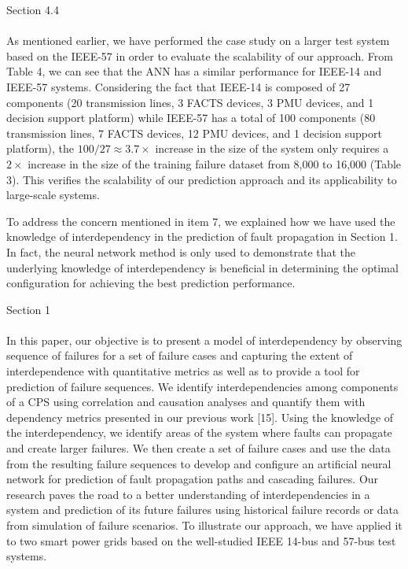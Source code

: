 \documentclass{article}
\newenvironment{response}{
  \doublespacing
  \setlength\parindent{0.05\linewidth}
  \ttfamily
}{}
\newenvironment{textblock}[1]
{\begin{tcolorbox}[breakable,enhanced]{#1 \\ \\}}
{\end{tcolorbox}}
\begin{document}
\begin{response}
\begin{textblock}{Section 4.4}
As mentioned earlier, we have performed the case study on a larger test system based on the IEEE-57 in order to evaluate the scalability of our approach. From Table 4, we can see that the ANN has a similar performance for IEEE-14 and IEEE-57 systems. Considering the fact that IEEE-14 is composed of 27 components (20 transmission lines, 3 FACTS devices, 3 PMU devices, and 1 decision support platform) while IEEE-57 has a total of 100 components (80 transmission lines, 7 FACTS devices, 12 PMU devices, and 1 decision support platform), the $100/27 \approx 3.7 \times$ increase in the size of the system only requires a $2 \times$ increase in the size of the training failure dataset from 8,000 to 16,000 (Table 3). This verifies the scalability of our prediction approach and its applicability to large-scale systems.
\end{textblock}

To address the concern mentioned in item 7, we explained how we have used the knowledge of interdependency in the prediction of fault propagation in Section 1. In fact, the neural network method is only used to demonstrate that the underlying knowledge of interdependency is beneficial in determining the optimal configuration for achieving the best prediction performance.

\begin{textblock}{Section 1}
In this paper, our objective is to present a model of interdependency by observing sequence of failures for a set of failure cases and capturing the extent of interdependence with quantitative metrics as well as to provide a tool for prediction of failure sequences. We identify interdependencies among components of a CPS using correlation and causation analyses and quantify them with dependency metrics presented in our previous work [15]. Using the knowledge of the interdependency, we identify areas of the system where faults can propagate and create larger failures. We then create a set of failure cases and use the data from the resulting failure sequences to develop and configure an artificial neural network for prediction of fault propagation paths and cascading failures. Our research paves the road to a better understanding of interdependencies in a system and prediction of its future failures using historical failure records or data from simulation of failure scenarios. To illustrate our approach, we have applied it to two smart power grids based on the well-studied IEEE 14-bus and 57-bus test systems.
\end{textblock}


\end{response}
\end{document}
